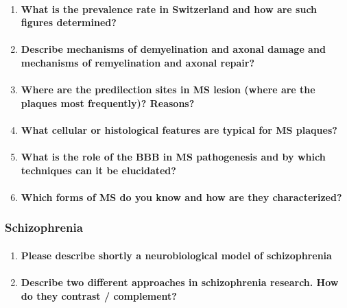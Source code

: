 \documentclass[12pt,article,oneside,a4paper]{memoir}
\begin{document}
\begin{enumerate}
\item \paragraph{What is the prevalence rate in Switzerland and how are such figures determined?}

\item \paragraph{Describe mechanisms of demyelination and axonal damage and mechanisms of remyelination and axonal repair?}

\item \paragraph{Where are the predilection sites in MS lesion (where are the plaques most frequently)? Reasons?}

\item \paragraph{What cellular or histological features are typical for MS plaques?}

\item \paragraph{What is the role of the BBB in MS pathogenesis and by which techniques can it be elucidated?}

\item \paragraph{Which forms of MS do you know and how are they characterized?}

\end{enumerate}

\subsubsection{Schizophrenia}
\begin{enumerate}
\item \paragraph{Please describe shortly a neurobiological model of schizophrenia}

\item \paragraph{Describe two different approaches in schizophrenia research. How do they contrast / complement?}
\end{enumerate}
\end{document}
